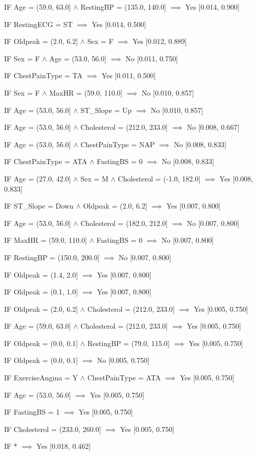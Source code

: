 IF Age = (59.0, 63.0] $\land$ RestingBP = (135.0, 140.0] $\implies$ Yes [0.014, 0.900]

IF RestingECG = ST $\implies$ Yes [0.014, 0.500]

IF Oldpeak = (2.0, 6.2] $\land$ Sex = F $\implies$ Yes [0.012, 0.889]

IF Sex = F $\land$ Age = (53.0, 56.0] $\implies$ No [0.011, 0.750]

IF ChestPainType = TA $\implies$ Yes [0.011, 0.500]

IF Sex = F $\land$ MaxHR = (59.0, 110.0] $\implies$ No [0.010, 0.857]

IF Age = (53.0, 56.0] $\land$ ST\_Slope = Up $\implies$ No [0.010, 0.857]

IF Age = (53.0, 56.0] $\land$ Cholesterol = (212.0, 233.0] $\implies$ No [0.008, 0.667]

IF Age = (53.0, 56.0] $\land$ ChestPainType = NAP $\implies$ No [0.008, 0.833]

IF ChestPainType = ATA $\land$ FastingBS = 0 $\implies$ No [0.008, 0.833]

IF Age = (27.0, 42.0] $\land$ Sex = M $\land$ Cholesterol = (-1.0, 182.0] $\implies$ Yes [0.008, 0.833]

IF ST\_Slope = Down $\land$ Oldpeak = (2.0, 6.2] $\implies$ Yes [0.007, 0.800]

IF Age = (53.0, 56.0] $\land$ Cholesterol = (182.0, 212.0] $\implies$ No [0.007, 0.800]

IF MaxHR = (59.0, 110.0] $\land$ FastingBS = 0 $\implies$ No [0.007, 0.800]

IF RestingBP = (150.0, 200.0] $\implies$ No [0.007, 0.800]

IF Oldpeak = (1.4, 2.0] $\implies$ Yes [0.007, 0.800]

IF Oldpeak = (0.1, 1.0] $\implies$ Yes [0.007, 0.800]

IF Oldpeak = (2.0, 6.2] $\land$ Cholesterol = (212.0, 233.0] $\implies$ Yes [0.005, 0.750]

IF Age = (59.0, 63.0] $\land$ Cholesterol = (212.0, 233.0] $\implies$ Yes [0.005, 0.750]

IF Oldpeak = (0.0, 0.1] $\land$ RestingBP = (79.0, 115.0] $\implies$ Yes [0.005, 0.750]

IF Oldpeak = (0.0, 0.1] $\implies$ No [0.005, 0.750]

IF ExerciseAngina = Y $\land$ ChestPainType = ATA $\implies$ Yes [0.005, 0.750]

IF Age = (53.0, 56.0] $\implies$ Yes [0.005, 0.750]

IF FastingBS = 1 $\implies$ Yes [0.005, 0.750]

IF Cholesterol = (233.0, 260.0] $\implies$ Yes [0.005, 0.750]

IF * $\implies$ Yes [0.018, 0.462]
